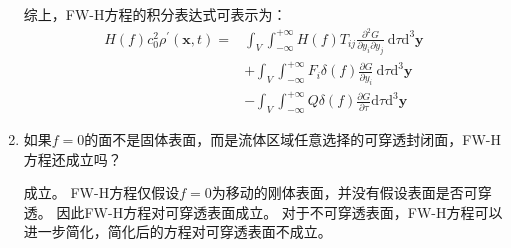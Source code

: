 \begin{enumerate}
\begin{equation}
        \end{equation}
        综上，FW-H方程的积分表达式可表示为：
        \begin{equation}
            \begin{aligned}
                H(f) c_{0}^{2} \rho^{\prime}(\mathbf{x}, t)
                =&\int_{V} \int_{-\infty}^{+\infty} H(f) T_{i j} \frac{\partial^{2} G}{\partial y_{i} \partial y_{j}} \mathrm{~d} \tau \mathrm{d}^{3} \mathbf{y} \\
                &+\int_{V} \int_{-\infty}^{+\infty} F_{i} \delta(f) \frac{\partial G}{\partial y_{i}} \mathrm{~d} \tau \mathrm{d}^{3} \mathbf{y} \\
                &-\int_{V} \int_{-\infty}^{+\infty} Q \delta(f) \frac{\partial G}{\partial \tau} \mathrm{d} \tau \mathrm{d}^{3} \mathbf{y}   
            \end{aligned}
        \end{equation}



    \item 如果\(f=0\)的面不是固体表面，而是流体区域任意选择的可穿透封闭面，FW-H方程还成立吗？
    
        成立。
        FW-H方程仅假设\(f=0\)为移动的刚体表面，并没有假设表面是否可穿透。
        因此FW-H方程对可穿透表面成立。
        对于不可穿透表面，FW-H方程可以进一步简化，简化后的方程对可穿透表面不成立。

        
\end{enumerate}